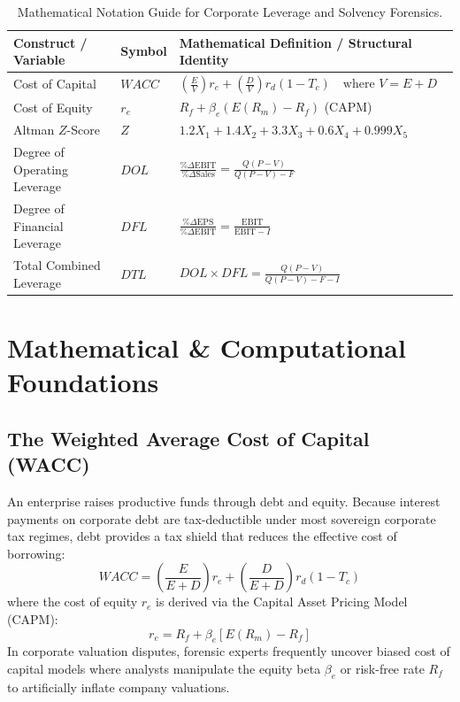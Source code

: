 \begin{table}[htbp]
\centering
\small
\begin{tabularx}{\textwidth}{llX}
\toprule
\textbf{Construct / Variable} & \textbf{Symbol} & \textbf{Mathematical Definition / Structural Identity} \\
\midrule
Cost of Capital & $WACC$ & $\left(\frac{E}{V}\right) r_e + \left(\frac{D}{V}\right) r_d (1 - T_c) \quad \text{where } V = E + D$ \\
Cost of Equity & $r_e$ & $R_f + \beta_e \left(E(R_m) - R_f\right)$ (CAPM) \\
Altman $Z$-Score & $Z$ & $1.2 X_1 + 1.4 X_2 + 3.3 X_3 + 0.6 X_4 + 0.999 X_5$ \\
Degree of Operating Leverage & $DOL$ & $\frac{\% \Delta \text{EBIT}}{\% \Delta \text{Sales}} = \frac{Q(P - V)}{Q(P - V) - F}$ \\
Degree of Financial Leverage & $DFL$ & $\frac{\% \Delta \text{EPS}}{\% \Delta \text{EBIT}} = \frac{\text{EBIT}}{\text{EBIT} - I}$ \\
Total Combined Leverage & $DTL$ & $DOL \times DFL = \frac{Q(P - V)}{Q(P - V) - F - I}$ \\
\bottomrule
\end{tabularx}
\caption{Mathematical Notation Guide for Corporate Leverage and Solvency Forensics.}
\label{tab:w7_notation}
\end{table}

\section{Mathematical \& Computational Foundations}

\subsection{The Weighted Average Cost of Capital (WACC)}
An enterprise raises productive funds through debt and equity. Because interest payments on corporate debt are tax-deductible under most sovereign corporate tax regimes, debt provides a tax shield that reduces the effective cost of borrowing:
\begin{equation}
WACC = \left(\frac{E}{E + D}\right) r_e + \left(\frac{D}{E + D}\right) r_d (1 - T_c)
\label{eq:wacc_formula}
\end{equation}
where the cost of equity $r_e$ is derived via the Capital Asset Pricing Model (CAPM):
\begin{equation}
r_e = R_f + \beta_e \left[E(R_m) - R_f\right]
\label{eq:capm_formula}
\end{equation}
In corporate valuation disputes, forensic experts frequently uncover biased cost of capital models where analysts manipulate the equity beta $\beta_e$ or risk-free rate $R_f$ to artificially inflate company valuations.

